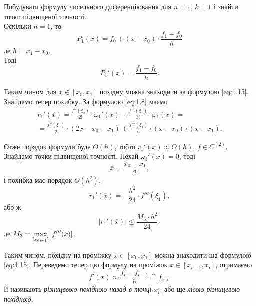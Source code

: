 \begin{example}
	Побудувати формулу чисельного диференціювання для $n = 1$, $k = 1$ і знайти точки підвищеної точності. \\

	Оскільки $n = 1$, то
	\begin{equation}
		\label{eq:1.14}
		P_1(x) = f_0 + (x - x_0) \cdot \frac{f_1 - f_0}{h}
	\end{equation}
	де $h = x_1 - x_0$. \\

	Тоді
	\begin{equation}
		\label{eq:1.15}
		P_1'(x) = \frac{f_1 - f_0}{h}.
	\end{equation}

	Таким чином для $x \in [x_0, x_1]$ похідну можна знаходити за формулою \eqref{eq:1.15}. \\

	Знайдемо тепер похибку. За формулою \eqref{eq:1.8} маємо
	\begin{multline}
		\label{eq:1.16}
		r_1'(x) = \frac{f''(\xi_0)}{2!} \cdot \omega_1'(x) + \frac{f'''(\xi_1)}{3!} \cdot \omega_1(x) = \\ = \frac{f''(\xi_0)}{2} \cdot (2x - x_0 - x_1) + \frac{f'''(\xi_1)}{6} \cdot (x - x_0) \cdot (x - x_1).
	\end{multline}

	Отже порядок формули буде $O(h)$, тобто $r_1'(x) \approx O(h)$, $f \in C^{(2)}$.\\

	Знайдемо точки підвищеної точності. Нехай $\omega_1'(x) = 0$, тоді
	\begin{equation}
		\label{eq:1.17}
		\bar x = \frac{x_0 + x_1}{2},
	\end{equation}
	і похибка має порядок $O(h^2)$, 
	\begin{equation}
		\label{eq:1.18}
		r_1'(\bar x) = - \frac{h^2}{24} \cdot f'''(\xi_1),
	\end{equation}
	або ж
	\begin{equation}
		\label{eq:1.19}
		|r_1'(\bar x)| \le \frac{M_3 \cdot h^2}{24},
	\end{equation}
	де $M_3 = \displaystyle\max\limits_{[x_0, x_1]} |f'''(x)|$.
\end{example}

Таким чином, похідну на проміжку $x \in [x_0, x_1]$ можна знаходити ща формулою \eqref{eq:1.15}. Переведемо тепер цю формулу на проміжок $x \in [x_{i - 1}, x_i]$, отримаємо
\begin{equation}
	\label{eq:1.20}
	f'(x) \approx \frac{f_i - f_{i - 1}}{h} \overset{\triangle}{=} f_{\bar x, i}.
\end{equation}
Її називають \textit{різницевою похідною назад в точці $x_i$}, або ще \textit{лівою різницевою похідною}. \\

